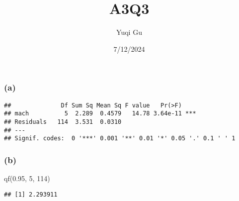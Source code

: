 \documentclass[
]{article}
\title{A3Q3}
\author{Yuqi Gu}
\date{7/12/2024}
\newenvironment{Shaded}{\begin{snugshade}}{\end{snugshade}}
\newcommand{\AttributeTok}[1]{\textcolor[rgb]{0.77,0.63,0.00}{#1}}
\newcommand{\DecValTok}[1]{\textcolor[rgb]{0.00,0.00,0.81}{#1}}
\newcommand{\FloatTok}[1]{\textcolor[rgb]{0.00,0.00,0.81}{#1}}
\newcommand{\FunctionTok}[1]{\textcolor[rgb]{0.00,0.00,0.00}{#1}}
\newcommand{\NormalTok}[1]{#1}
\newcommand{\OtherTok}[1]{\textcolor[rgb]{0.56,0.35,0.01}{#1}}
\newcommand{\SpecialCharTok}[1]{\textcolor[rgb]{0.00,0.00,0.00}{#1}}
\newcommand{\StringTok}[1]{\textcolor[rgb]{0.31,0.60,0.02}{#1}}
\begin{document}
\maketitle

\hypertarget{a}{%
\subsubsection{(a)}\label{a}}

\begin{Shaded}
\end{Shaded}

\begin{verbatim}
##              Df Sum Sq Mean Sq F value   Pr(>F)    
## mach          5  2.289  0.4579   14.78 3.64e-11 ***
## Residuals   114  3.531  0.0310                     
## ---
## Signif. codes:  0 '***' 0.001 '**' 0.01 '*' 0.05 '.' 0.1 ' ' 1
\end{verbatim}

\hypertarget{b}{%
\subsubsection{(b)}\label{b}}

\begin{Shaded}
\begin{Highlighting}[]
\FunctionTok{qf}\NormalTok{(}\FloatTok{0.95}\NormalTok{, }\DecValTok{5}\NormalTok{, }\DecValTok{114}\NormalTok{)}
\end{Highlighting}
\end{Shaded}

\begin{verbatim}
## [1] 2.293911
\end{verbatim}
\end{document}
